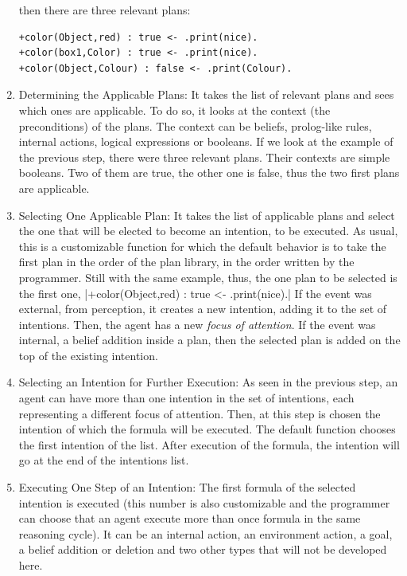 \documentclass[a4paper,11pt,twoside]{StyleThese}
\begin{document}
\begin{enumerate}
\begin{lstlisting}[style=inline]
\end{lstlisting}
	then there are three relevant plans:
\begin{lstlisting}[style=inline]
+color(Object,red) : true <- .print(nice).
+color(box1,Color) : true <- .print(nice).
+color(Object,Colour) : false <- .print(Colour).
\end{lstlisting}
	\item Determining the Applicable Plans: It takes the list of relevant plans and sees which ones are applicable. To do so, it looks at the context (the preconditions) of the plans. The context can be beliefs, prolog-like rules, internal actions, logical expressions or booleans. If we look at the example of the previous step, there were three relevant plans. Their contexts are simple booleans. Two of them are true, the other one is false, thus the two first plans are applicable.
	\item Selecting One Applicable Plan: It takes the list of applicable plans and select the one that will be elected to become an intention, \ie to be executed. As usual, this is a customizable function for which the default behavior is to take the first plan in the order of the plan library, \ie in the order written by the programmer. Still with the same example, thus, the one plan to be selected is the first one, |+color(Object,red) : true <- .print(nice).| If the event was external, \ie from perception, it creates a new intention, adding it to the set of intentions. Then, the agent has a new \textit{focus of attention}. If the event was internal, \eg a belief addition inside a plan, then the selected plan is added on the top of the existing intention. 
	\item Selecting an Intention for Further Execution: As seen in the previous step, an agent can have more than one intention in the set of intentions, each representing a different focus of attention. Then, at this step is chosen the intention of which the formula will be executed. The default function chooses the first intention of the list. After execution of the formula, the intention will go at the end of the intentions list.
	\item Executing One Step of an Intention: The first formula of the selected intention is executed (this number is also customizable and the programmer can choose that an agent execute more than once formula in the same reasoning cycle). It can be an internal action, an environment action, a goal, a belief addition or deletion and two other types that will not be developed here. 
\end{enumerate}
\end{document}
